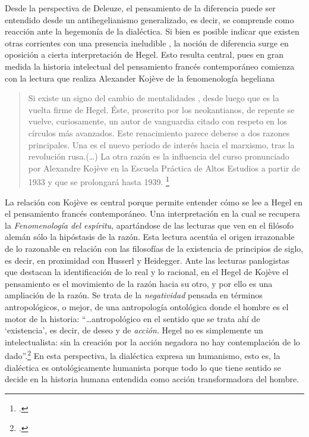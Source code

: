 Desde la perspectiva de Deleuze, el pensamiento de la diferencia puede ser entendido desde un antihegelianismo generalizado, es decir, se comprende como reacción ante la hegemonía de la dialéctica. Si bien es posible indicar que existen otras corrientes con una presencia ineludible , la noción de diferencia surge en oposición a cierta interpretación de Hegel. Esto resulta central, pues en gran medida la historia intelectual del pensamiento francés contemporáneo comienza con la lectura que realiza Alexander Kojève de la fenomenología hegeliana

\begin{quote}
Si existe un signo del cambio de mentalidades , desde luego que es la vuelta firme de Hegel. Éste, proscrito por los neokantianos, de repente se vuelve, curiosamente, un autor de vanguardia citado con respeto en los círculos más avanzados. Este renacimiento parece deberse a dos razones principales. Una es el nuevo período de interés hacia el marxismo, tras la revolución rusa.(\dots) La otra razón es la influencia del curso pronunciado por Alexandre Kojève en la Escuela Práctica de Altos Estudios a partir de 1933 y que se prolongará hasta 1939. \footcite[28]{@6962-DESCOMBES1998}
\end{quote}

La relación con Kojève es central porque permite entender cómo se lee a Hegel en el pensamiento francés contemporáneo. Una interpretación en la cual se recupera la \emph{Fenomenología del espíritu}, apartándose de las lecturas que ven en el filósofo alemán sólo la hipóstasis de la razón. Esta lectura acentúa el origen irrazonable de lo razonable en relación con las filosofías de la existencia de principios de siglo, es decir, en proximidad con Husserl y Heidegger. Ante las lecturas panlogistas que destacan la identificación de lo real y lo racional, en el Hegel de Kojève el pensamiento es el movimiento de la razón hacia su otro, y por ello es una ampliación de la razón. Se trata de la \emph{negatividad} pensada en términos antropológicos, o mejor, de una antropología ontológica donde el hombre es el motor de la historia: \enquote{\ldots antropológico en el sentido que se trata ahí de \enquote{existencia}, es decir, de deseo y de \emph{acción}. Hegel no es simplemente un intelectualista: sin la creación por la acción negadora no hay contemplación de lo dado}.\footcite[53]{@6963-KOJEVE1996} En esta perspectiva, la dialéctica expresa un humanismo, esto es, la dialéctica es ontológicamente humanista porque todo lo que tiene sentido se decide en la historia humana entendida como acción transformadora del hombre.

